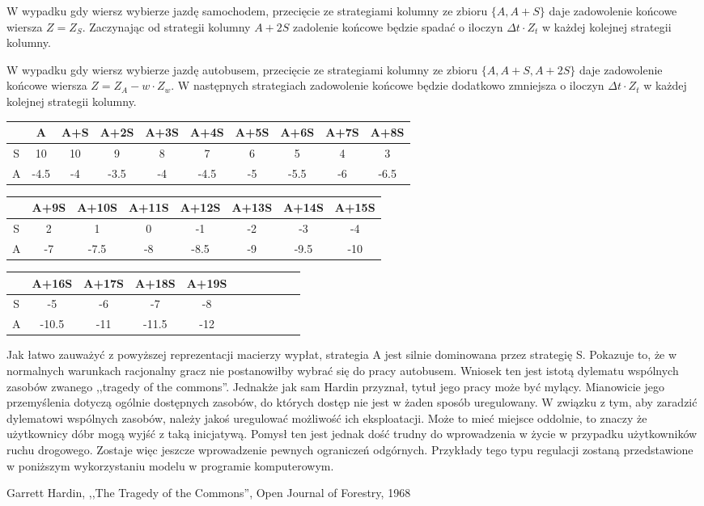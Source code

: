 \documentclass[12pt,a4paper]{article}
\begin{document}
W wypadku gdy wiersz wybierze jazdę samochodem, przecięcie ze strategiami kolumny ze zbioru $\{A, A+S\}$ daje zadowolenie końcowe wiersza $Z = Z_S$. Zaczynając od strategii kolumny $A+2S$ zadolenie końcowe będzie spadać o iloczyn $\Delta{t} \cdot Z_t$ w każdej kolejnej strategii kolumny. 

W wypadku gdy wiersz wybierze jazdę autobusem, przecięcie ze strategiami kolumny ze zbioru $\{A, A+S, A+2S\}$ daje zadowolenie końcowe wiersza $Z = Z_A - w \cdot Z_w$. W następnych strategiach zadowolenie końcowe będzie dodatkowo zmniejsza o  iloczyn $\Delta{t} \cdot Z_t$ w każdej kolejnej strategii kolumny.\\

\begin{tabular}{|c|c|c|c|c|c|c|c|c|c|} \hline
& A & A+S& A+2S& A+3S& A+4S& A+5S& A+6S& A+7S&A+8S\\ \hline
S& 10 & 10 & 9 & 8 & 7 & 6 & 5 & 4 & 3  \\ \hline
A& -4.5 & -4 & -3.5 & -4 & -4.5 & -5 & -5.5 & -6 & -6.5 \\ \hline
\end{tabular}

\begin{tabular}{|c|c|c|c|c|c|c|c|} \hline
& A+9S& A+10S&  A+11S& A+12S& A+13S& A+14S& A+15S \\ \hline
S& 2 & 1 & 0 & -1 & -2 & -3 & -4\\ \hline
A& -7 & -7.5 & -8 & -8.5 & -9 & -9.5 & -10\\ \hline
\end{tabular}

\begin{tabular}{|c|c|c|c|c|c|c|c|c|c|c|} \hline
& A+16S & A+17S& A+18S& A+19S\\ \hline
S& -5 & -6 & -7 & -8\\ \hline
A& -10.5 & -11 & -11.5 & -12\\ \hline
\end{tabular}

Jak łatwo zauważyć z powyższej reprezentacji macierzy wypłat, strategia A jest silnie dominowana przez strategię S. Pokazuje to, że w normalnych warunkach racjonalny gracz nie postanowiłby wybrać się do pracy autobusem. Wniosek ten jest istotą dylematu wspólnych zasobów zwanego ,,tragedy of the commons''. Jednakże jak sam Hardin przyznał, tytuł jego pracy \cite{hardin} może być mylący. Mianowicie jego przemyślenia dotyczą ogólnie dostępnych zasobów, do których dostęp nie jest w żaden sposób uregulowany. W związku z tym, aby zaradzić dylematowi wspólnych zasobów, należy jakoś uregulować możliwość ich eksploatacji. Może to mieć miejsce oddolnie, to znaczy że użytkownicy dóbr mogą wyjść z taką inicjatywą. Pomysł ten jest jednak dość trudny do wprowadzenia w życie w przypadku użytkowników ruchu drogowego. Zostaje więc jeszcze wprowadzenie pewnych ograniczeń odgórnych. Przykłady tego typu regulacji zostaną przedstawione w poniższym wykorzystaniu modelu w programie komputerowym.

\begin{thebibliography}{9}
Garrett Hardin, ,,The Tragedy of the Commons'', Open Journal of Forestry, 1968
\end{thebibliography}
\end{document}
